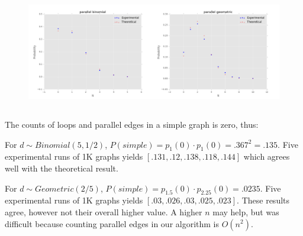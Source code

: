 \documentclass{article}
\begin{document}
\begin{figure}[!ht]
	\centering
	\includegraphics[width=\textwidth]{parallel.png}
	\label{parallel}
\end{figure}

\subsection{}
\vspace{-2ex}
The counts of loops and parallel edges in a simple graph is zero, thus:

For $d\sim Binomial(5,1/2)$, $P(simple)=p_1(0)\cdot p_1(0)=.367^2=.135$. Five experimental runs of 1K graphs yields $[.131,.12,.138,.118,.144]$ which agrees well with the theoretical result.

For $d\sim Geometric(2/5)$, $P(simple)=p_{1.5}(0)\cdot p_{2.25}(0)=.0235$. Five experimental runs of 1K graphs yields $[.03,.026,.03, .025, .023]$. These results agree, however not their overall higher value. A higher $n$ may help, but was difficult because counting parallel edges in our algorithm is $O(n^2)$.
\end{document}
